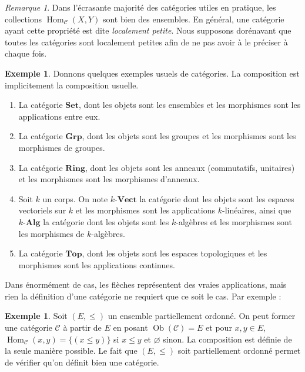 \documentclass{article}
\newcommand{\cat}{\mathcal{C}}
\newcommand{\Set}{\mathbf{Set}}
\newcommand{\Alg}{\mathbf{Alg}}
\newcommand{\Top}{\mathbf{Top}}
\newcommand{\Grp}{\mathbf{Grp}}
\newcommand{\Vectcat}{\mathbf{Vect}}
\newcommand{\Ring}{\mathbf{Ring}}
\DeclareMathOperator{\Ob}{Ob}
\DeclareMathOperator{\Hom}{Hom}
\theoremstyle{plain}
\theoremstyle{definition}
\newtheorem{example}[theorem]{Exemple}
\theoremstyle{remark}
\newtheorem*{remark}{Remarque}
\begin{document}
\begin{remark}
    Dans l'écrasante majorité des catégories utiles en pratique, les collections $\Hom_\cat(X,Y)$ sont bien des ensembles. En général, une catégorie ayant cette propriété est dite \emph{localement petite}. Nous supposons dorénavant que toutes les catégories sont localement petites afin de ne pas avoir à le préciser à chaque fois.
\end{remark}

\begin{example} Donnons quelques exemples usuels de catégories. La composition est implicitement la composition usuelle.
    \begin{enumerate}
        \item La catégorie $\Set$, dont les objets sont les ensembles et les morphismes sont les applications entre eux.
        \item La catégorie $\Grp$, dont les objets sont les groupes et les morphismes sont les morphismes de groupes.
        \item La catégorie $\Ring$, dont les objets sont les anneaux (commutatifs, unitaires) et les morphismes sont les morphismes d'anneaux.
        \item Soit $k$ un corps. On note $k\text{-}\Vectcat$ la catégorie dont les objets sont les espaces vectoriels sur $k$ et les morphismes sont les applications $k$-linéaires, ainsi que $k\text{-}\Alg$ la catégorie dont les objets sont les $k$-algèbres et les morphismes sont les morphismes de $k$-algèbres.
        \item La catégorie $\Top$, dont les objets sont les espaces topologiques et les morphismes sont les applications continues.
    \end{enumerate}
\end{example}

Dans énormément de cas, les flèches représentent des vraies applications, mais rien la définition d'une catégorie ne requiert que ce soit le cas. Par exemple :

\begin{example}
    Soit $(E,\le)$ un ensemble partiellement ordonné. On peut former une catégorie $\cat$ à partir de $E$ en posant $\Ob(\cat) = E$ et pour $x,y \in E$, $\Hom_\cat (x,y) = \{(x \le y)\}$ si $x \le y$ et $\varnothing$ sinon. La composition est définie de la seule manière possible. Le fait que $(E,\le)$ soit partiellement ordonné permet de vérifier qu'on définit bien une catégorie.
\end{example}
\end{document}
